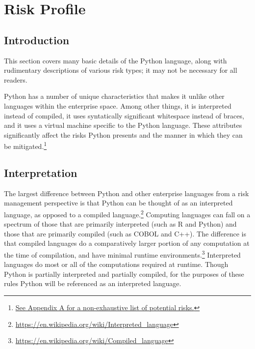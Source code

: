  
\section{Risk Profile}
 
\thispagestyle{section_start_style}
 
                \subsection{Introduction}
 
                                \begin{tcolorbox}
                                                This section covers many basic details of the Python language, along with rudimentary descriptions of various risk types; it may not be necessary for all readers.
                                \end{tcolorbox}
 
                                Python has a number of unique characteristics that makes it unlike other languages within the enterprise space. Among other things, it is interpreted instead of compiled, it uses syntatically significant whitespace instead of braces, and it uses a virtual machine specific to the Python language. These attributes significantly affect the risks Python presents and the manner in which they can be mitigated.\footnote{\hyperref[sec:appendix_b]{See Appendix A for a non-exhaustive list of potential risks.}}
 
                \subsection{Interpretation}
 
                                The largest difference between Python and other enterprise languages from a risk management perspective is that Python can be thought of as an interpreted language, as opposed to a compiled language.\footnote{\url{https://en.wikipedia.org/wiki/Interpreted_language}} Computing languages can fall on a spectrum of those that are primarily interpreted (such as R and Python) and those that are primarily compiled (such as COBOL and C++). The difference is that compiled languages do a comparatively larger portion of any computation at the time of compilation, and have minimal runtime environments.\footnote{\url{https://en.wikipedia.org/wiki/Compiled_language}} Interpreted languages do most or all of the computations required at runtime. Though Python is partially interpreted and partially compiled, for the purposes of these rules Python will be referenced as an interpreted language.
 
